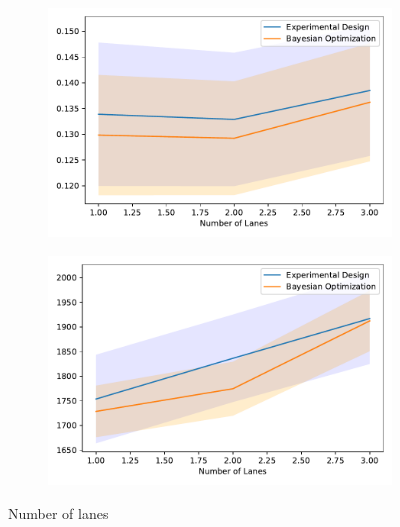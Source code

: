\begin{figure}[h!]
\centering
\begin{subfigure}{0.5\textwidth}
  \centering
  \includegraphics[width=\textwidth]{images/ofat_compare/time/number_of_lanes.pdf}
\end{subfigure}%
\begin{subfigure}{0.5\textwidth}
  \centering
  \includegraphics[width=\textwidth]{images/ofat_compare/co2/number_of_lanes.pdf}
\end{subfigure}
\caption{Number of lanes}
\end{figure}

